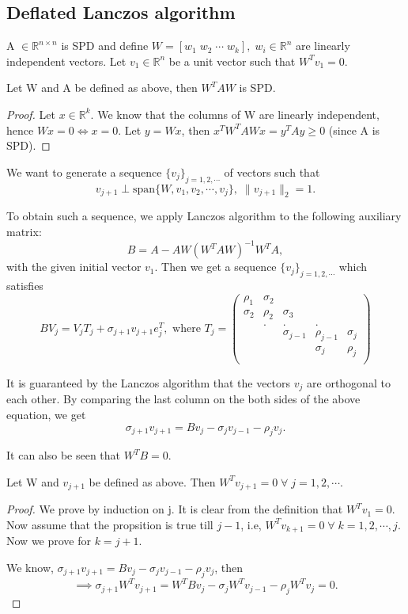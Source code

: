 \documentclass[10pt,a4paper]{article}
\begin{document}
\subsection{Deflated Lanczos algorithm}

A $\in \mathbb{R}^{n \times n}$ is SPD and define $W=[w_1\;w_2\;\cdots\;w_k],\;w_i\in\mathbb{R}^n$ are linearly independent vectors. Let $v_1\in\mathbb{R}^n$ be a unit vector such that $W^Tv_1=0.$

\begin{prop}
Let W and A be defined as above, then $W^TAW$ is SPD.
\end{prop}

\begin{proof}
Let $x\in\mathbb{R}^k$. We know that the columns of W are linearly independent, hence $Wx=0 \Leftrightarrow x=0.$ Let $y=Wx$, then $x^TW^TAWx=y^TAy\ge 0$ (since A is SPD).
\end{proof}

We want to generate a sequence $\{v_j\}_{j=1,2,\cdots}$ of vectors such that 
$$v_{j+1}\perp \text{span}\{W,v_1,v_2,\cdots,v_j\},\;\|v_{j+1}\|_2=1.$$

To obtain such a sequence, we apply Lanczos algorithm to the following auxiliary  matrix:
$$B=A-AW(W^TAW)^{-1}W^TA,$$
with the given initial vector $v_1$. Then we get a sequence $\{v_j\}_{j=1,2,\cdots}$ which satisfies
$$BV_j=V_jT_j+\sigma_{j+1}v_{j+1}e^T_j,\text{ where }
T_j = \left( \begin{array}{ccccc}
\rho_1 & \sigma_2 &  &  &  \\
\sigma_2 & \rho_2 & \sigma_3 &  &  \\
 & . & . & . &  \\
 &  & \sigma_{j-1} & \rho_{j-1} & \sigma_{j} \\
 &  &  & \sigma_j & \rho_j \\
\end{array} \right)$$

It is guaranteed by the Lanczos algorithm that the vectors $v_j$ are orthogonal to each other. By comparing the last column on the both sides of the above equation, we get
$$\sigma_{j+1}v_{j+1}=Bv_j-\sigma_jv_{j-1}-\rho_jv_j.$$

It can also be seen that $W^TB=0.$

\begin{prop}
Let W and $v_{j+1}$ be defined as above. Then $W^Tv_{j+1}=0\;\forall\;j=1,2,\cdots.$
\end{prop}

\begin{proof}
We prove by induction on j. It is clear from the definition that $W^Tv_1=0.$ Now assume that the propsition is true till $j-1$, i.e, $W^Tv_{k+1}=0\;\forall\;k=1,2,\cdots,j.$ Now we prove for $k=j+1.$ 

We know, $\sigma_{j+1}v_{j+1}=Bv_j-\sigma_jv_{j-1}-\rho_jv_j$, then
$$\implies \sigma_{j+1}W^Tv_{j+1} = W^TBv_j-\sigma_jW^Tv_{j-1}-\rho_jW^Tv_j=0.$$
\end{proof}
\end{document}
